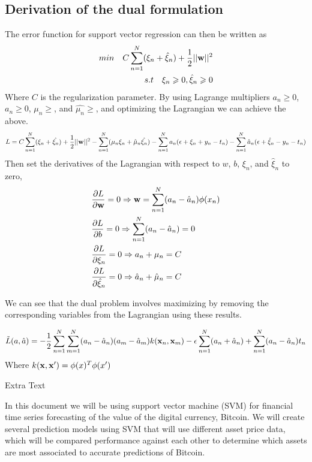 \appendix

\subsection{Derivation of the dual formulation}
The error function for support vector regression can then be written as
\begin{align}
    min \quad C\sum^{N}_{n=1}(\xi_n+\hat{\xi}_n)+\frac{1}{2}||\bold{w}||^2 \\
    s.t \quad \xi_n \geqslant 0, \hat{\xi}_n \geqslant 0
\end{align}
Where $C$ is the regularization parameter. By using Lagrange multipliers $a_n\geqslant0$, $a_n\geqslant0$, $\mu_n\geqslant$, and $\hat{\mu_n}\geqslant$, and optimizing the Lagrangian we can achieve the above. 
\begin{align}
    L=C\sum^N_{n=1}(\xi_n+\hat{\xi_n})+\frac{1}{2}||\bold{w}||^2-\sum^N_{n=1}(\mu_n\xi_n+\hat{\mu}_n\hat{\xi_n})-\sum^N_{n=1}a_n(\epsilon+\xi_n+y_n-t_n)-\sum^N_{n=1}\hat{a}_n(\epsilon+\hat{\xi}_n-y_n-t_n)
\end{align}
Then set the derivatives of the Lagrangian with respect to $w$, $b$, $\xi_n$, and $\hat{\xi}_n$ to zero,
\begin{align}
&\frac{\partial L}{\partial \bold{w}}=0 \Rightarrow \bold{w}=\sum^N_{n=1}(a_n-\hat{a}_n)\phi(x_n) \\
&\frac{\partial L}{\partial b}=0 \Rightarrow \sum^N_{n=1}(a_n-\hat{a}_n) = 0 \\
&\frac{\partial L}{\partial \xi_n}=0 \Rightarrow a_n + \mu_n = C \\
&\frac{\partial L}{\partial \hat{\xi}_n}=0 \Rightarrow \hat{a}_n + \hat{\mu}_n = C
\end{align}

We can see that the dual problem involves maximizing by removing the corresponding variables from the Lagrangian using these results.

\begin{align}
\Tilde{L}(a,\hat{a})=-\frac{1}{2}\sum^N_{n=1}\sum^N_{m=1}(a_n-\hat{a}_n)(a_m-\hat{a}_m)k(\bold{x}_n,\bold{x}_m)-\epsilon\sum^N_{n=1}(a_n+\hat{a}_n)+\sum^N_{n=1}(a_n-\hat{a}_n)t_n
\end{align}
Where $k(\bold{x},\bold{x}')=\phi(x)^T\phi(x')$




Extra Text

In this document we will be using support vector machine (SVM) for financial time series forecasting of the value of the digital currency, Bitcoin. We will create several prediction models using SVM that will use different asset price data, which will be compared performance against each other to determine which assets are most associated to accurate predictions of Bitcoin.  



